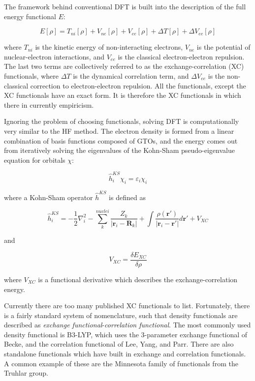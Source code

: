 The framework behind conventional DFT is built into the description of the full
energy functional $E$:

\begin{equation}
  E[\rho] = T_{ni}[\rho] + V_{ne}[\rho] + V_{ee}[\rho] + \Delta T[\rho] + \Delta V_{ee}[\rho]
\end{equation}

\noindent where $T_{ni}$ is the kinetic energy of non-interacting electrons,
$V_{ne}$ is the potential of nuclear-electron interactions, and $V_{ee}$ is the
classical electron-electron repulsion. The last two terms are collectively
referred to as the exchange-correlation (XC) functionals, where $\Delta T$ is
the dynamical correlation term, and $\Delta V_{ee}$ is the non-classical
correction to electron-electron repulsion. All the functionals, except the XC
functionals have an exact form. It is therefore the XC functionals in which
there in currently empiricism.

Ignoring the problem of choosing functionals, solving DFT is computationally
very similar to the HF method. The electron density is formed from a linear
combination of basis functions composed of GTOs, and the energy comes out from
iteratively solving the eigenvalues of the Kohn-Sham pseudo-eigenvalue equation
for orbitals $\chi$:

\begin{equation}
  \hat{h}_i^{KS} \chi_i = \varepsilon_i \chi_i
\end{equation}

\noindent where a Kohn-Sham operator $\hat{h}^{KS}$ is defined as

\begin{equation}
  \hat{h}_i^{KS} = -\frac{1}{2}\nabla^2_i - \sum_k^{nuclei}\frac{Z_k}{|\mathbf{r}_i-\mathbf{R}_k|} +
  \int \frac{\rho(\mathbf{r}\prime)}{|\mathbf{r}_i-\mathbf{r}\prime|}d\mathbf{r}\prime + V_{XC}
\end{equation}

\noindent and

\begin{equation}
  V_{XC} = \frac{\delta E_{XC}}{\delta\rho}
\end{equation}

\noindent where $V_{XC}$ is a functional derivative which describes the
exchange-correlation energy.

Currently there are too many published XC functionals to list. Fortunately,
there is a fairly standard system of nomenclature, such that density functionals
are described as \emph{exchange functional}-\emph{correlation functional}. The
most commonly used density functional is B3-LYP, which uses the 3-parameter
exchange functional of Becke,\cite{Becke1993} and the correlation functional of
Lee, Yang, and Parr.\cite{Lee1988} There are also standalone functionals which
have built in exchange and correlation functionals. A common example of these
are the Minnesota family of functionals from the Truhlar
group.\cite{Zhao2006,Zhao2006a}

